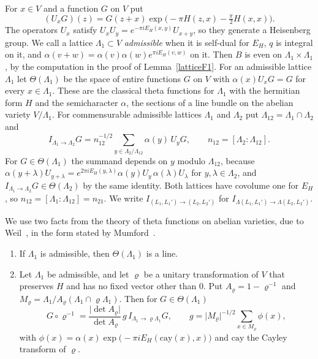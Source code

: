 For $x\in V$ and a function $G$ on $V$ put
\[
(U_xG)(z)=G(z+x)\exp\big(-\pi H(z,x)-\tfrac\pi2H(x,x)\big).
\]
The operators $U_x$ satisfy $U_xU_y=e^{-\pi iE_H(x,y)}U_{x+y}$, so they generate a Heisenberg group. We call a lattice $\Lambda_1\subset V$ \emph{admissible} when it is self-dual for $E_H$, $q$ is integral on it, and $\alpha(v+w)=\alpha(v)\alpha(w)e^{\pi iE_H(v,w)}$ on it. Then $B$ is even on $\Lambda_1\times\Lambda_1$, by the computation in the proof of Lemma~\ref{latticeF1}. For an admissible lattice $\Lambda_1$ let $\Theta(\Lambda_1)$ be the space of entire functions $G$ on $V$ with $\alpha(x)U_xG=G$ for every $x\in\Lambda_1$. These are the classical theta functions for $\Lambda_1$ with the hermitian form $H$ and the semicharacter $\alpha$, the sections of a line bundle on the abelian variety $V/\Lambda_1$. For commensurable admissible lattices $\Lambda_1$ and $\Lambda_2$ put $\Lambda_{12}=\Lambda_1\cap\Lambda_2$ and
\[
I_{\Lambda_1\to\Lambda_2}G=n_{12}^{-1/2}\sum_{y\in\Lambda_2/\Lambda_{12}}\alpha(y)\,U_yG,\qquad n_{12}=[\Lambda_2:\Lambda_{12}].
\]
For $G\in\Theta(\Lambda_1)$ the summand depends on $y$ modulo $\Lambda_{12}$, because $\alpha(y+\lambda)U_{y+\lambda}=e^{2\pi iE_H(y,\lambda)}\alpha(y)U_y\,\alpha(\lambda)U_\lambda$ for $y,\lambda\in\Lambda_2$, and $I_{\Lambda_1\to\Lambda_2}G\in\Theta(\Lambda_2)$ by the same identity. Both lattices have covolume one for $E_H$, so $n_{12}=[\Lambda_1:\Lambda_{12}]=n_{21}$. We write $I_{(L_1,L_1')\to(L_2,L_2')}$ for $I_{\Lambda(L_1,L_1')\to\Lambda(L_2,L_2')}$.

We use two facts from the theory of theta functions on abelian varieties, due to Weil~\cite{weil64}, in the form stated by Mumford~\cite{mumfordtata3}.
\begin{enumerate}
\item[(W1)] If $\Lambda_1$ is admissible, then $\Theta(\Lambda_1)$ is a line.
\item[(W3)] Let $\Lambda_1$ be admissible, and let $\varrho$ be a unitary transformation of $V$ that preserves $H$ and has no fixed vector other than $0$. Put $A_\varrho=1-\varrho^{-1}$ and $M_\varrho=\Lambda_1/A_\varrho(\Lambda_1\cap\varrho\Lambda_1)$. Then for $G\in\Theta(\Lambda_1)$
\[
G\circ\varrho^{-1}=\frac{\lvert\det A_\varrho\rvert}{\det A_\varrho}\,g\,I_{\Lambda_1\to\varrho\Lambda_1}G,\qquad g=\lvert M_\varrho\rvert^{-1/2}\sum_{x\in M_\varrho}\phi(x),
\]
with $\phi(x)=\alpha(x)\exp\big(-\pi iE_H(\mathrm{cay}(x),x)\big)$ and $\mathrm{cay}$ the Cayley transform of $\varrho$.
\end{enumerate}

